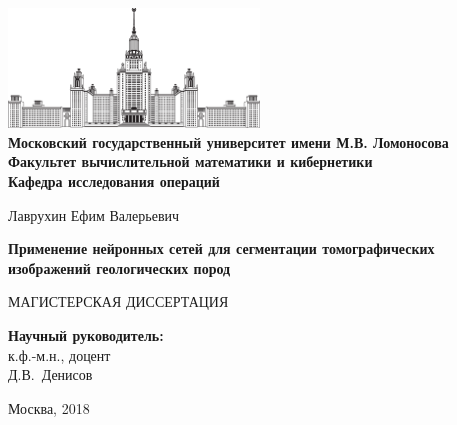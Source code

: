 \documentclass[14pt, a4paper, oneside, bold]{extarticle}
\begin{document}
\allowdisplaybreaks[1]

\begin{titlepage}
\begin{center}
\ \vspace{-1.5cm}

\includegraphics[width=0.5\textwidth]{msu_logo.eps}\\
{\bfseries Московский государственный университет имени М.В. Ломоносова \\
Факультет вычислительной математики и кибернетики\\
Кафедра исследования операций}

\vspace{3cm}

{\Large Лаврухин Ефим Валерьевич}

\vspace{1cm}

{\Large\bfseries
Применение нейронных сетей для сегментации томографических изображений геологических пород\\}

\vspace{1cm}

{\textbf \large МАГИСТЕРСКАЯ ДИССЕРТАЦИЯ}
\end{center}

\vfill

\begin{flushright}
  \textbf{Научный руководитель:}\\
  к.ф.-м.н., доцент\\
  Д.В.~Денисов
\end{flushright}

\vfill

\begin{center}
Москва, 2018
\end{center}

\vspace{1cm}

\enlargethispage{2\baselineskip}

\end{titlepage}



\newpage
\end{document}
